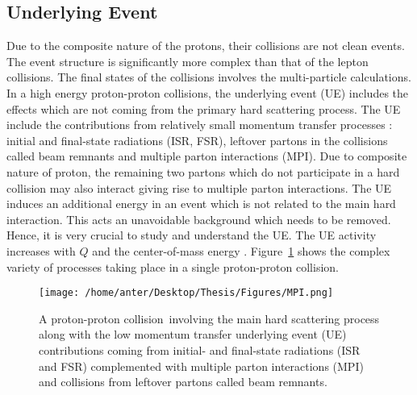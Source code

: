 \subsection{Underlying Event}
Due to the composite nature of the protons, their collisions are not clean events. The event structure is significantly more complex than that of the lepton collisions. The final states of the collisions involves the multi-particle calculations. In a high energy proton-proton collisions, the underlying event (UE) includes the effects which are not coming from the primary hard scattering process. The UE include the contributions from relatively small momentum transfer processes : initial and final-state radiations (ISR, FSR), leftover partons in the collisions called beam remnants and multiple parton interactions (MPI). Due to composite nature of proton, the remaining two partons which do not participate in a hard collision may also interact giving rise to multiple parton interactions. The UE induces an additional energy in an event which is not related to the main hard interaction. This acts an unavoidable background which needs to be removed. Hence, it is very crucial to study and understand the UE. The UE activity increases with $Q$ and the center-of-mass energy \cme. Figure~\ref{fig:MPI} shows the complex variety of processes taking place in a single proton-proton collision.

\begin{figure}[!h]
\begin{center}
\hspace*{-7mm}
\texttt{[image: /home/anter/Desktop/Thesis/Figures/MPI.png]}\\
\vspace*{4mm}
\caption[A proton-proton collision involving the main hard scattering process along with the low momentum transfer underlying event (UE) contributions.]{A proton-proton collision\footnotemark~involving the main hard scattering process along with the low momentum transfer underlying event (UE) contributions coming from initial- and final-state radiations (ISR and FSR) complemented with multiple parton interactions (MPI) and collisions from leftover partons called beam remnants.}
\label{fig:MPI}
\end{center}
\end{figure}

